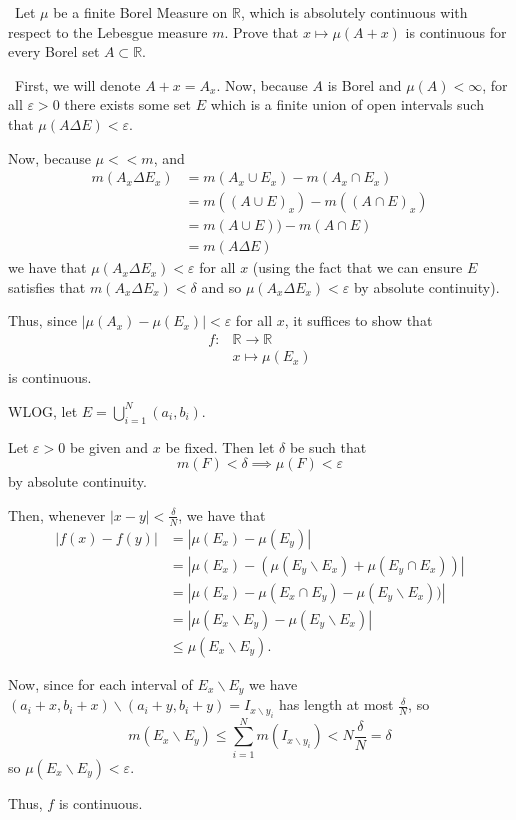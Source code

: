 \documentclass[12pt]{Homework}
\begin{document}
\begin{problem} $\,$
Let $\mu$ be a finite Borel Measure on $\mathbb{R}$, which is absolutely continuous with respect to the Lebesgue measure $m$. Prove that $x\mapsto\mu(A+x)$ is continuous for every Borel set $A\subset\mathbb{R}$.
\end{problem}


\begin{solution}$\,$
First, we will denote $A+x=A_x$. Now, because $A$ is Borel and $\mu(A)<\infty$, for all $\varepsilon>0$ there exists some set $E$ which is a finite union of open intervals such that $\mu(A\Delta E)<\varepsilon$.

Now, because $\mu<<m$, and \begin{align*}
    m(A_x\Delta E_x)&=m(A_x\cup E_x)-m(A_x\cap E_x)\\
    &=m((A\cup E)_x)-m((A\cap E)_x)\\
    &=m(A\cup E))-m(A\cap E)\\
    &=m(A\Delta E)
\end{align*}
we have that $\mu(A_x\Delta E_x)<\varepsilon$ for all $x$ (using the fact that we can ensure $E$ satisfies that $m(A_x\Delta E_x)<\delta$ and so $\mu(A_x\Delta E_x)<\varepsilon$ by absolute continuity).

Thus, since $|\mu(A_x)-\mu(E_x)|<\varepsilon$ for all $x$, it suffices to show that \begin{align*}
    f:&\mathbb{R}\to\mathbb{R}\\
    &x\mapsto \mu(E_x)
\end{align*} is continuous.

WLOG, let $E=\bigcup_{i=1}^N(a_i,b_i)$.

Let $\varepsilon>0$ be given and $x$ be fixed. Then let $\delta$ be such that $$m(F)<\delta\implies \mu(F)<\varepsilon$$ by absolute continuity. 

Then, whenever $|x-y|<\frac{\delta}{N}$, we have that \begin{align*}
    |f(x)-f(y)|&=|\mu(E_x)-\mu(E_y)|\\
    &=|\mu(E_x)-(\mu(E_y\backslash E_x)+\mu(E_y\cap E_x))|\\
    &=|\mu(E_x)-\mu(E_x\cap E_y)-\mu(E_y\backslash E_x))|\\
    &=|\mu(E_x\backslash E_y)-\mu(E_y\backslash E_x)|\\
    &\le \mu(E_x\backslash E_y).
\end{align*}

Now, since for each interval of $E_x\backslash E_y$ we have $(a_i+x,b_i+x)\backslash (a_i+y,b_i+y)=I_{{x\backslash y}_i}$ has length at most $\frac{\delta}{N}$, so $$m(E_x\backslash E_y)\le\sum_{i=1}^Nm(I_{{x\backslash y}_i})<N\frac{\delta}{N}=\delta$$ so $\mu(E_x\backslash E_y)<\varepsilon$.

Thus, $f$ is continuous.
\end{solution}
\newpage
\end{document}
